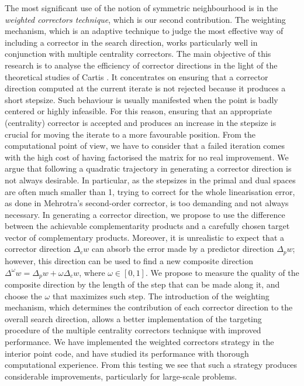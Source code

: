 The most significant use of the notion of symmetric neighbourhood
is in the {\em weighted correctors technique},
which is our second contribution.
The weighting mechanism, which is an adaptive technique to judge the
most effective way of including a corrector in the search direction, 
works particularly well in conjunction with multiple centrality
correctors.
The main objective of this research is to analyse the efficiency of
corrector directions in the light of the theoretical studies of Cartis
\cite{Cartis04,Cartis05}. It concentrates on ensuring that a corrector
direction computed at the current iterate is not rejected because it
produces a short stepsize. Such behaviour is usually manifested when
the point is badly centered or highly infeasible.
For this reason, ensuring that an appropriate (centrality) corrector
is accepted and produces an increase in the stepsize is crucial
for moving the iterate to a more favourable position.
From the computational point of view, we have to consider that
a failed iteration comes with the high cost of having factorised
the matrix for no real improvement.
We argue that following a quadratic trajectory in generating a
corrector direction is not always desirable. In particular, as the stepsizes 
in the primal and dual spaces are often much smaller than 1,
trying to correct for the whole linearisation error,
as done in Mehrotra's second-order corrector, is too
demanding and not always necessary.
In generating a corrector direction, we propose to use 
the difference between the achievable complementarity products 
and a carefully chosen target vector of complementary products.
Moreover, it is unrealistic to expect that a corrector direction $\Delta_c w$
can absorb the error made by a predictor direction $\Delta_p w$;
however, this direction can be used to find a new composite
direction $\Delta^\omega w = \Delta_p w + \omega\Delta_c w$, where
$\omega \in [0,1]$.
We propose to measure the quality of the composite direction
by the length of the step that can be made along it, and choose
the $\omega$ that maximizes such step.
The introduction of the weighting mechanism, which determines
the contribution of each corrector direction to the overall
search direction, allows a better implementation
of the targeting procedure of the multiple centrality correctors technique
with improved performance.
We have implemented the weighted correctors strategy in the \HOPDM
interior point code, and have studied its performance with thorough
computational experience. 
From this testing we see that such a strategy 
produces considerable improvements, particularly for large-scale
problems.

